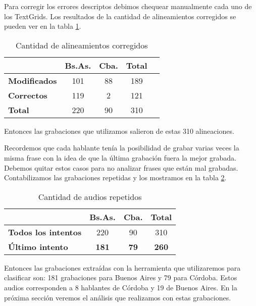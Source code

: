 Para corregir los errores descriptos debimos chequear manualmente cada uno de los TextGrids. Los resultados de la cantidad de alineamientos corregidos se pueden ver en la tabla \ref{eva_table_align}.

\begin{table}[h]
\centering
\begin{tabular}{|l|c|c|c|c|}
\hline
\textbf{}  & \textbf{Bs.As. } & \textbf{Cba.} & \textbf{Total} \\ \hline
\textbf{Modificados}  & 101 & 88 & 189 \\ \hline
\textbf{Correctos}  & 119 & 2 & 121 \\ \hline
\textbf{Total} & 220 & 90 & 310 \\ \hline
\end{tabular}
\caption{Cantidad de alineamientos corregidos}
\label{eva_table_align}
\end{table}

Entonces las grabaciones que utilizamos salieron de estas 310 alineaciones. 

Recordemos que cada hablante tenía la posibilidad de grabar varias veces la misma frase con la idea de que la última grabación fuera la mejor grabada. Debemos quitar estos casos para no analizar frases que están mal grabadas. Contabilizamos las grabaciones repetidas y los mostramos en la tabla \ref{eva_table_rep}.

\begin{table}[H]
\centering
\begin{tabular}{|l|c|c|c|}
\hline
\textbf{}  & \textbf{Bs.As. } & \textbf{Cba.} & \textbf{Total} \\ \hline
\textbf{Todos los intentos}  & 220 & 90 & 310 \\ \hline
\textbf{Último intento}  & \textbf{181} & \textbf{79} & \textbf{260} \\ \hline
\end{tabular}
\caption{Cantidad de audios repetidos}
\label{eva_table_rep}
\end{table}

Entonces las grabaciones extraídas con la herramienta que utilizaremos para clasificar son: 181 grabaciones para Buenos Aires y 79 para Córdoba. Estos audios corresponden a 8 hablantes de Córdoba y 19 de Buenos Aires.
En la próxima sección veremos el análisis que realizamos con estas grabaciones. 